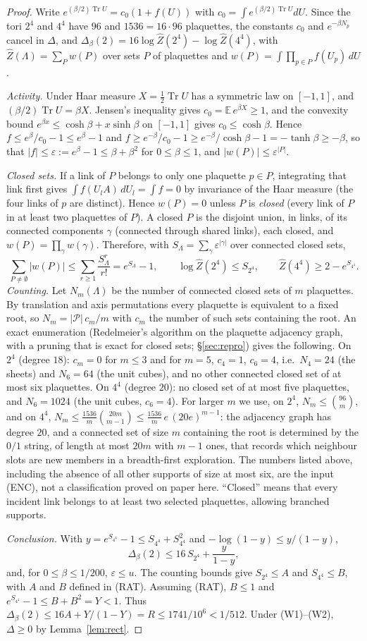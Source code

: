 \documentclass[11pt,a4paper]{article}
\theoremstyle{plain}
\theoremstyle{definition}
\theoremstyle{remark}
\numberwithin{equation}{section}
\newcommand{\Tr}{\operatorname{Tr}}
\newcommand{\COUNTS}{the following. On $2^4$ (degree $18$): $c_m=0$ for $m\le3$ and for $m=5$, $c_4=1$, $c_6=4$, i.e.\ $N_4=24$ (the sheets) and $N_6=64$ (the unit cubes), and no other connected closed set of at most six plaquettes. On $4^4$ (degree $20$): no closed set of at most five plaquettes, and $N_6=1024$ (the unit cubes, $c_6=4$)}
\begin{document}
\begin{proof}
Write $e^{(\beta/2)\Tr U}=c_0(1+f(U))$ with $c_0=\int e^{(\beta/2)\Tr U}dU$. Since the tori $2^4$ and $4^4$ have $96$ and $1536=16\cdot96$
plaquettes, the constants $c_0$ and $e^{-\beta N_p}$ cancel in $\Delta$, and $\Delta_\beta(2)=16\log\widehat Z(2^4)-\log\widehat Z(4^4)$,
with $\widehat Z(\Lambda)=\sum_{P}w(P)$ over sets $P$ of plaquettes and $w(P)=\int\prod_{p\in P}f(U_p)\,dU$.

\emph{Activity.} Under Haar measure $X=\frac12\Tr U$ has a symmetric law on $[-1,1]$, and $(\beta/2)\Tr U=\beta X$. Jensen's inequality
gives $c_0=\mathbb E\,e^{\beta X}\ge1$, and the convexity bound $e^{\beta x}\le\cosh\beta+x\sinh\beta$ on $[-1,1]$ gives $c_0\le\cosh\beta$.
Hence $f\le e^\beta/c_0-1\le e^\beta-1$ and $f\ge e^{-\beta}/c_0-1\ge e^{-\beta}/\cosh\beta-1=-\tanh\beta\ge-\beta$, so that
$|f|\le\varepsilon:=e^\beta-1\le\beta+\beta^2$ for $0\le\beta\le1$, and $|w(P)|\le\varepsilon^{|P|}$.

\emph{Closed sets.} If a link of $P$ belongs to only one plaquette $p\in P$, integrating that link first gives $\int f(U_lA)\,dU_l=\int
f=0$ by invariance of the Haar measure (the four links of $p$ are distinct). Hence $w(P)=0$ unless $P$ is
\emph{closed} (every link of $P$ in at least two plaquettes of $P$). A closed $P$ is the disjoint union, in links, of its connected
components $\gamma$ (connected through shared links), each closed, and $w(P)=\prod_\gamma w(\gamma)$. Therefore, with
$S_\Lambda=\sum_\gamma\varepsilon^{|\gamma|}$ over connected closed sets,
\[
\sum_{P\ne\emptyset}|w(P)|\le\sum_{r\ge1}\frac{S_\Lambda^r}{r!}=e^{S_\Lambda}-1,\qquad\log\widehat Z(2^4)\le S_{2^4},\qquad
\widehat Z(4^4)\ge2-e^{S_{4^4}}.
\]
\emph{Counting.} Let $N_m(\Lambda)$ be the number of connected closed sets of $m$ plaquettes. By translation and axis permutations every
plaquette is equivalent to a fixed root, so $N_m=|\mathcal P|\,c_m/m$ with $c_m$ the number of such sets containing the root. An exact
enumeration (Redelmeier's algorithm on the plaquette adjacency graph, with a pruning that is exact for closed sets; \S\ref{sec:repro})
gives \COUNTS. For larger $m$ we use, on $2^4$, $N_m\le\binom{96}{m}$, and on $4^4$, $N_m\le\frac{1536}{m}\binom{20m}{m-1}\le
\frac{1536}{m}\,e\,(20e)^{m-1}$: the adjacency graph has degree $20$, and a connected set of size $m$ containing the root is determined
by the $0/1$ string, of length at most $20m$ with $m-1$ ones, that records which neighbour slots are new members in a breadth-first
exploration. The numbers listed above, including the absence of all other supports of size at most six, are the input (ENC), not a classification proved on paper here. ``Closed'' means that every incident link belongs to at least two selected plaquettes, allowing branched supports.

\emph{Conclusion.} With $y=e^{S_{4^4}}-1\le S_{4^4}+S_{4^4}^2$ and $-\log(1-y)\le y/(1-y)$,
\[
\Delta_\beta(2)\le16\,S_{2^4}+\frac{y}{1-y},
\]
and, for $0\le\beta\le1/200$, $\varepsilon\le u$. The counting bounds give $S_{2^4}\le A$ and $S_{4^4}\le B$, with $A$ and $B$ defined in (RAT). Assuming (RAT), $B\le1$ and $e^{S_{4^4}}-1\le B+B^2=Y<1$. Thus $\Delta_\beta(2)\le16A+Y/(1-Y)=R\le1741/10^6<1/512$. Under (W1)--(W2), $\Delta\ge0$ by Lemma~\ref{lem:rect}.
\end{proof}
\end{document}
